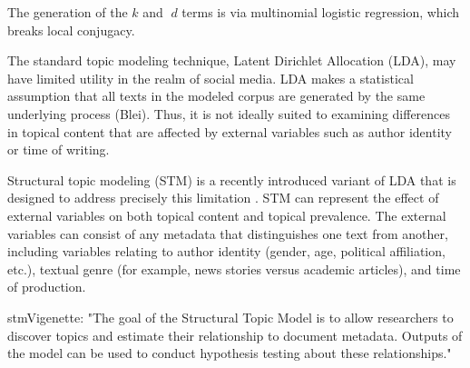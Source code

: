 \documentclass[12pt,a4paper,notitlepage]{article}
\begin{document}
The generation of the $k$ and $d$ terms is via multinomial logistic regression, which breaks local conjugacy.

The standard topic modeling technique, Latent Dirichlet Allocation (LDA), may have limited utility in the realm of social media. LDA makes a statistical assumption that all texts in the modeled corpus are generated by the same underlying process (Blei). Thus, it is not ideally suited to examining differences in topical content that are affected by external variables such as author identity or time of writing.

Structural topic modeling (STM) is a recently introduced variant of LDA that is designed to address precisely this limitation . STM can represent the effect of external variables on both topical content and topical prevalence. The external variables can consist of any metadata that distinguishes one text from another, including variables relating to author identity (gender, age, political affiliation, etc.), textual genre (for example, news stories versus academic articles), and time of production.

stmVigenette: "The goal of the Structural Topic Model is to allow researchers to discover topics and estimate their relationship to document metadata. Outputs of the model can be used to conduct hypothesis testing about these relationships."  
\end{document}
